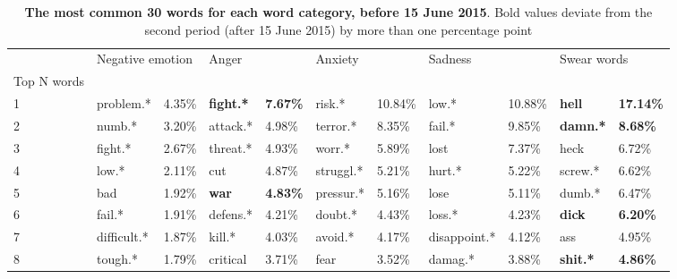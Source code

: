 \begin{table}[h]\centering
\caption{\textbf{The most common 30 words for each word category, before 15 June 2015}. Bold values deviate from the second period (after 15 June 2015) by more than one percentage point}
	\label{fig: before_1}
\begin{adjustbox}{width=\linewidth, center}
	\begin{tabular}{lllllllllll}
	\toprule
	{} & \multicolumn{2}{l}{Negative emotion} & \multicolumn{2}{l}{Anger} & \multicolumn{2}{l}{Anxiety} & \multicolumn{2}{l}{Sadness} & \multicolumn{2}{l}{Swear words} \\
	Top N words          &                  &            &                   &                  &              &            &               &            &                  &                   \\
	\midrule
	1                    &        problem.* &     4.35\% &  \textbf{fight.*} &  \textbf{7.67\%} &       risk.* &    10.84\% &         low.* &    10.88\% &    \textbf{hell} &  \textbf{17.14\%} \\
	2                    &           numb.* &     3.20\% &          attack.* &           4.98\% &     terror.* &     8.35\% &        fail.* &     9.85\% &  \textbf{damn.*} &   \textbf{8.68\%} \\
	3                    &          fight.* &     2.67\% &          threat.* &           4.93\% &       worr.* &     5.89\% &          lost &     7.37\% &             heck &            6.72\% \\
	4                    &            low.* &     2.11\% &               cut &           4.87\% &    struggl.* &     5.21\% &        hurt.* &     5.22\% &          screw.* &            6.62\% \\
	5                    &              bad &     1.92\% &      \textbf{war} &  \textbf{4.83\%} &    pressur.* &     5.16\% &          lose &     5.11\% &           dumb.* &            6.47\% \\
	6                    &           fail.* &     1.91\% &          defens.* &           4.21\% &      doubt.* &     4.43\% &        loss.* &     4.23\% &    \textbf{dick} &   \textbf{6.20\%} \\
	7                    &      difficult.* &     1.87\% &            kill.* &           4.03\% &      avoid.* &     4.17\% &  disappoint.* &     4.12\% &              ass &            4.95\% \\
	8                    &          tough.* &     1.79\% &          critical &           3.71\% &         fear &     3.52\% &       damag.* &     3.88\% &  \textbf{shit.*} &   \textbf{4.86\%} \\

\end{tabular}
\end{adjustbox}
\end{table}
